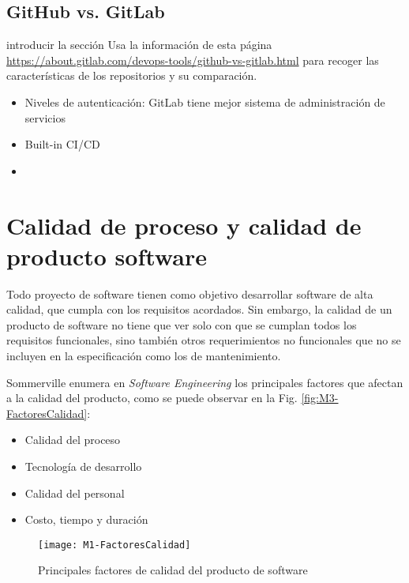 \subsection{GitHub vs. GitLab}

\todo introducir la sección
\todo Usa la información de esta página \url{https://about.gitlab.com/devops-tools/github-vs-gitlab.html} para recoger las características de los repositorios 
y su comparación.

\begin{itemize}
	\item Niveles de autenticación: GitLab tiene mejor sistema de administración de servicios
	\item Built-in CI/CD
	\item 
\end{itemize}

\section{Calidad de proceso y calidad de producto software}

Todo proyecto de software tienen como objetivo desarrollar software de alta calidad, que cumpla con los requisitos acordados. Sin embargo, la calidad de un producto de software no tiene que ver solo con que se cumplan todos los requisitos funcionales, sino también otros requerimientos no funcionales que no se incluyen en la especificación como los de mantenimiento.

Sommerville enumera en \textit{Software Engineering} \cite{sommerville_ingenierisoftware_2002} los principales factores que afectan a la calidad del producto, como se puede observar en la Fig. \ref{fig:M3-FactoresCalidad}:
\begin{itemize}
	\tightlist
	\item Calidad del proceso
	\item Tecnología de desarrollo
	\item Calidad del personal
	\item Costo, tiempo y duración
\end{itemize}
\begin{figure}[!h]
	\centering
	\texttt{[image: M1-FactoresCalidad]}
	\caption{Principales factores de calidad del producto de software\cite{sommerville_ingenierisoftware_2002}}\label{fig:M1-FactoresCalidad}
\end{figure}
\FloatBarrier


